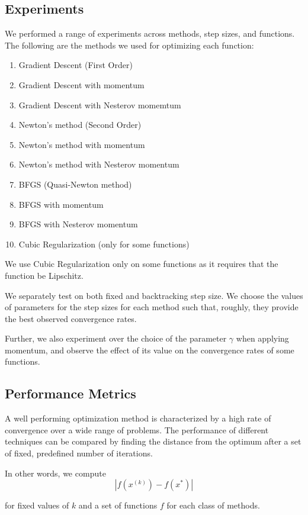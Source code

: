 \documentclass{article}
\begin{document}
\subsection{Experiments}
We performed a range of experiments across methods, step sizes, and functions. The following are the methods we used for optimizing each function:
\begin{enumerate}
	\item Gradient Descent (First Order)
	\item Gradient Descent with momentum
	\item Gradient Descent with Nesterov momemtum
	\item Newton's method (Second Order)
	\item Newton's method with momentum 
	\item Newton's method with Nesterov momentum
	\item BFGS (Quasi-Newton method)
	\item BFGS with momentum
	\item BFGS with Nesterov momentum
	\item Cubic Regularization (only for some functions)
\end{enumerate}

We use Cubic Regularization only on some functions as it requires that the function be Lipschitz.

We separately test on both fixed and backtracking step size. We choose the values of parameters for the step sizes for each method such that, roughly, they provide the best observed convergence rates.

Further, we also experiment over the choice of the parameter $\gamma$ when applying momentum, and observe the effect of its value on the convergence rates of some functions.

\subsection{Performance Metrics}
A well performing optimization method is characterized by a high rate of convergence over a wide range of problems. The performance of different techniques can be compared by finding the distance from the optimum after a set of fixed, predefined number of iterations.

In other words, we compute
\begin{equation}
|f(x^{(k)}) - f(x^*)|
\end{equation}

for fixed values of $k$ and a set of functions $f$ for each class of methods.
\end{document}
